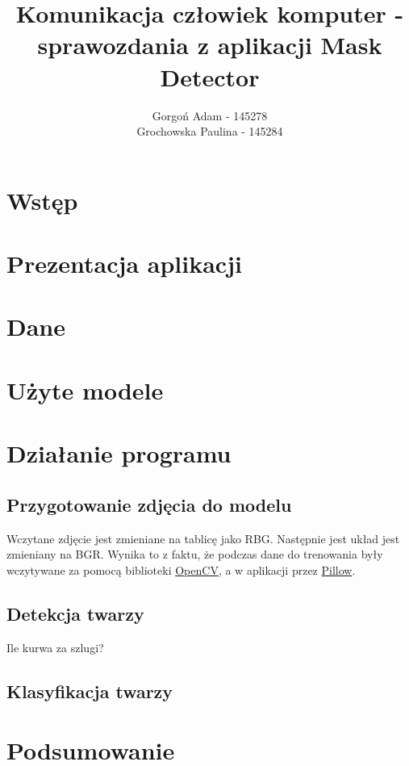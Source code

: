 \documentclass[12pt]{article}
\title{Komunikacja człowiek komputer - sprawozdania z aplikacji Mask Detector}
\author{Gorgoń Adam - 145278\\Grochowska Paulina - 145284}
\begin{document}
	\maketitle
	
	\section{Wstęp}
	\section{Prezentacja aplikacji}
	\section{Dane}
	\section{Użyte modele}
	\section{Działanie programu}
		\subsection{Przygotowanie zdjęcia do modelu}
		Wczytane zdjęcie jest zmieniane na tablicę jako RBG. Następnie jest układ jest zmieniany na BGR. Wynika to z faktu, że podczas dane do trenowania były wczytywane za pomocą biblioteki \href{https://opencv.org/}{OpenCV}, a w aplikacji przez \href{https://pillow.readthedocs.io/en/stable/}{Pillow}.
		
		\subsection{Detekcja twarzy}
		Ile kurwa za szlugi?\cite{marx_kapital_1962}
		\subsection{Klasyfikacja twarzy}
	\section{Podsumowanie}
	
\end{document}
